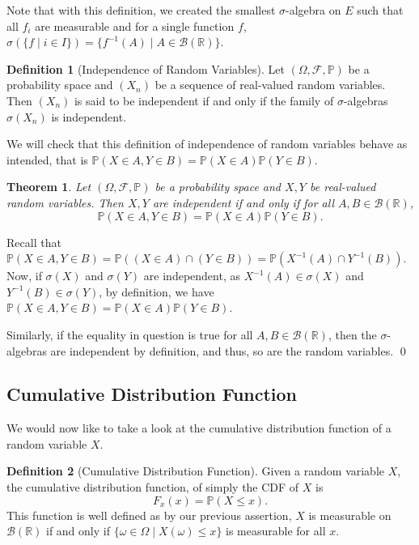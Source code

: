 \documentclass[
]{article}
\newtheorem{theorem}{Theorem}
\theoremstyle{definition}
\newtheorem{definition}{Definition}[section]
\begin{document}
Note that with this definition, we created the smallest
\(\sigma\)-algebra on \(E\) such that all \(f_i\) are measurable and for
a single function \(f\),
\(\sigma(\{f \mid i \in I\}) = \{f^{-1}(A) \mid A \in \mathcal{B}(\mathbb{R})\}\).

\begin{definition}[Independence of Random Variables]
  Let \((\Omega, \mathcal{F}, \mathbb{P})\) be a probability space and \((X_n)\) 
  be a sequence of real-valued random variables. Then \((X_n)\) is said to be 
  independent if and only if the family of \(\sigma\)-algebras \(\sigma(X_n)\) 
  is independent.
\end{definition}

We will check that this definition of independence of random variables
behave as intended, that is
\(\mathbb{P}(X \in A, Y \in B) = \mathbb{P}(X \in A) \mathbb{P}(Y \in B)\).

\begin{theorem}
  Let \((\Omega, \mathcal{F}, \mathbb{P})\) be a probability space and 
  \(X, Y\) be real-valued random variables. Then \(X, Y\) are independent if 
  and only if for all \(A, B \in \mathcal{B}(\mathbb{R})\), 
  \[\mathbb{P}(X \in A, Y \in B) = \mathbb{P}(X \in A) \mathbb{P}(Y \in B).\]
\end{theorem}
\proof

Recall that
\(\mathbb{P}(X \in A, Y \in B) =  \mathbb{P}((X \in A) \cap (Y \in B)) =  \mathbb{P}(X^{-1}(A) \cap Y^{-1}(B))\).
Now, if \(\sigma(X)\) and \(\sigma(Y)\) are independent, as
\(X^{-1}(A) \in \sigma(X)\) and \(Y^{-1}(B) \in \sigma(Y)\), by
definition, we have
\(\mathbb{P}(X \in A, Y \in B) = \mathbb{P}(X \in A)\mathbb{P}(Y \in B)\).

Similarly, if the equality in question is true for all
\(A, B \in \mathcal{B}(\mathbb{R})\), then the \(\sigma\)-algebras are
independent by definition, and thus, so are the random variables. \qed

\hypertarget{cumulative-distribution-function}{%
\subsection{Cumulative Distribution
Function}\label{cumulative-distribution-function}}

We would now like to take a look at the cumulative distribution function
of a random variable \(X\).

\begin{definition}[Cumulative Distribution Function]
  Given a random variable \(X\), the cumulative distribution function, of simply 
  the CDF of \(X\) is 
  \[F_x(x) = \mathbb{P}(X \le x).\]
  This function is well defined as by our previous assertion, \(X\) is measurable 
  on \(\mathcal{B}(\mathbb{R})\) if and only if 
  \(\{\omega \in \Omega \mid X(\omega) \le x\}\) is measurable for all \(x\).
\end{definition}
\end{document}
